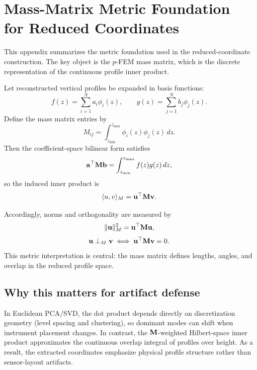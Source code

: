 \section{Mass-Matrix Metric Foundation for Reduced Coordinates}
\label{app:mass_matrix}

This appendix summarizes the metric foundation used in the reduced-coordinate construction. The key object is the $p$-FEM mass matrix, which is the discrete representation of the continuous profile inner product.

Let reconstructed vertical profiles be expanded in basis functions:
\begin{equation}
f(z) = \sum_{i=1}^{N} a_i \phi_i(z),
\qquad
g(z) = \sum_{j=1}^{N} b_j \phi_j(z).
\end{equation}
Define the mass matrix entries by
\begin{equation}
M_{ij} = \int_{z_{\min}}^{z_{\max}} \phi_i(z)\phi_j(z)\,dz.
\end{equation}
Then the coefficient-space bilinear form satisfies
\begin{equation}
\mathbf{a}^\top \mathbf{M} \mathbf{b} = \int_{z_{\min}}^{z_{\max}} f(z)g(z)\,dz,
\end{equation}
so the induced inner product is
\begin{equation}
\langle u,v\rangle_M = \mathbf{u}^\top \mathbf{M} \mathbf{v}.
\end{equation}

Accordingly, norms and orthogonality are measured by
\begin{equation}
\|\mathbf{u}\|_M^2 = \mathbf{u}^\top \mathbf{M} \mathbf{u},
\end{equation}
\begin{equation}
\mathbf{u} \perp_M \mathbf{v} \iff \mathbf{u}^\top \mathbf{M} \mathbf{v} = 0.
\end{equation}
This metric interpretation is central: the mass matrix defines lengths, angles, and overlap in the reduced profile space.

\subsection{Why this matters for artifact defense}

In Euclidean PCA/SVD, the dot product depends directly on discretization geometry (level spacing and clustering), so dominant modes can shift when instrument placement changes. In contrast, the $\mathbf{M}$-weighted Hilbert-space inner product approximates the continuous overlap integral of profiles over height. As a result, the extracted coordinates emphasize physical profile structure rather than sensor-layout artifacts.

